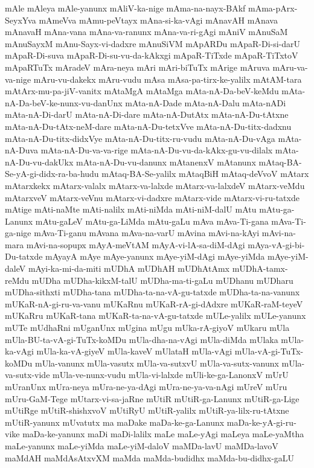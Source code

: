 {mAle
mAleya
mAle-yanunx
mAliV-ka-nige
mAma-na-nayx-BAkf
mAma-pArx-SeyxYva
mAmeVva
mAmu-peVtayx
mAna-si-ka-vAgi
mAnavAH
mAnava
mAnavaH
mAna-vana
mAna-va-ranunx
mAna-va-ri-gAgi
mAniV
mAnuSaM
mAnuSayxM
mAnu-Sayx-vi-dadxre
mAnuSiVM
mApARDu
mApaR-Di-si-darU
mApaR-Di-suva
mApaR-Di-su-vu-da-kAkxgi
mApaR-TiTxde
mApaR-TiTxtoV
mApaRTuTx
mAradeV
mAra-neya
mAri
mAri-biTuTx
mArige
mAruva
mAru-va-va-nige
mAru-vu-dakekx
mAru-vudu
mAsa
mAsa-pa-tirx-ke-yalilx
mAtAM-tara
mAtArx-mu-pa-jiV-vanitx
mAtaMgA
mAtaMga
mAta-nA-Da-beV-keMdu
mAta-nA-Da-beV-ke-nunx-vu-danUnx
mAta-nA-Dade
mAta-nA-Dalu
mAta-nADi
mAta-nA-Di-darU
mAta-nA-Di-dare
mAta-nA-DutAtx
mAta-nA-Du-tAtxne
mAta-nA-Du-tAtx-neM-dare
mAta-nA-Du-tetxVve
mAta-nA-Du-titx-dadxnu
mAta-nA-Du-titx-didxVye
mAta-nA-Du-titx-ru-vudu
mAta-nA-Du-vAga
mAta-nA-Duva
mAta-nA-Du-va-va-rige
mAta-nA-Du-vu-da-kAkx-gu-vu-dilalx
mAta-nA-Du-vu-dakUkx
mAta-nA-Du-vu-danunx
mAtanenxV
mAtanunx
mAtaq-BA-Se-yA-gi-didx-ra-ba-hudu
mAtaq-BA-Se-yalilx
mAtaqBiH
mAtaq-deVvoV
mAtarx
mAtarxkekx
mAtarx-valalx
mAtarx-va-lalxde
mAtarx-va-lalxdeV
mAtarx-veMdu
mAtarxveV
mAtarx-veVnu
mAtarx-vi-dadxre
mAtarx-vide
mAtarx-vi-ru-tatxde
mAtige
mAti-naMte
mAti-nalilx
mAti-niMda
mAti-niM-dalU
mAtu
mAtu-ga-Lanunx
mAtu-gaLeV
mAtu-ga-LiMda
mAtu-gaLu
mAva
mAva-Ti-gana
mAva-Ti-ga-nige
mAva-Ti-ganu
mAvana
mAva-na-varU
mAvina
mAvi-na-kAyi
mAvi-na-mara
mAvi-na-sopupx
mAyA-meVtAM
mAyA-vi-lA-sa-diM-dAgi
mAya-vA-gi-bi-Du-tatxde
mAyayA
mAye
mAye-yanunx
mAye-yiM-dAgi
mAye-yiMda
mAye-yiM-daleV
mAyi-ka-mi-da-miti
mUDhA
mUDhAH
mUDhAtAmx
mUDhA-tamx-reMdu
mUDha
mUDha-kikxM-talU
mUDha-ma-ti-gaLu
mUDhanu
mUDharu
mUDha-sithxti
mUDha-tana
mUDha-ta-na-vA-gu-tatxde
mUDha-ta-na-vanunx
mUKaR-nA-gi-ru-va-vanu
mUKaRnu
mUKaR-rA-gi-dAdxre
mUKaR-raM-teyeV
mUKaRru
mUKaR-tana
mUKaR-ta-na-vA-gu-tatxde
mULe-yalilx
mULe-yanunx
mUTe
mUdhaRni
mUganUnx
mUgina
mUgu
mUka-rA-giyoV
mUkaru
mUla
mUla-BU-ta-vA-gi-TuTx-koMDu
mUla-dha-na-vAgi
mUla-diMda
mUlaka
mUla-ka-vAgi
mUla-ka-vA-giyeV
mUla-kaveV
mUlataH
mUla-vAgi
mUla-vA-gi-TuTx-koMDu
mUla-vanunx
mUla-vasutx
mUla-va-sutxvU
mUla-va-sutx-vanunx
mUla-va-sutx-vide
mUla-ve-nunx-vudu
mUla-vi-lalxde
mUli-ke-ga-LanonxV
mUrU
mUranUnx
mUra-neya
mUra-ne-ya-dAgi
mUra-ne-ya-va-nAgi
mUreV
mUru
mUru-GaM-Tege
mUtarx-vi-sa-jaRne
mUtiR
mUtiR-ga-Lanunx
mUtiR-ga-Lige
mUtiRge
mUtiR-shishxvoV
mUtiRyU
mUtiR-yalilx
mUtiR-ya-lilx-ru-tAtxne
mUtiR-yanunx
mUvatutx
ma
maDake
maDa-ke-ga-Lanunx
maDa-ke-yA-gi-ru-vike
maDa-ke-yanunx
maDi
maDi-lalilx
maLe
maLe-yAgi
maLeya
maLe-yaMtha
maLe-yanunx
maLe-yiMda
maLe-yiM-daloV
maMDa-lavU
maMDa-lavoV
maMdAH
maMdAsAtxvXM
maMda
maMda-budidhx
maMda-bu-didhx-gaLU
}
